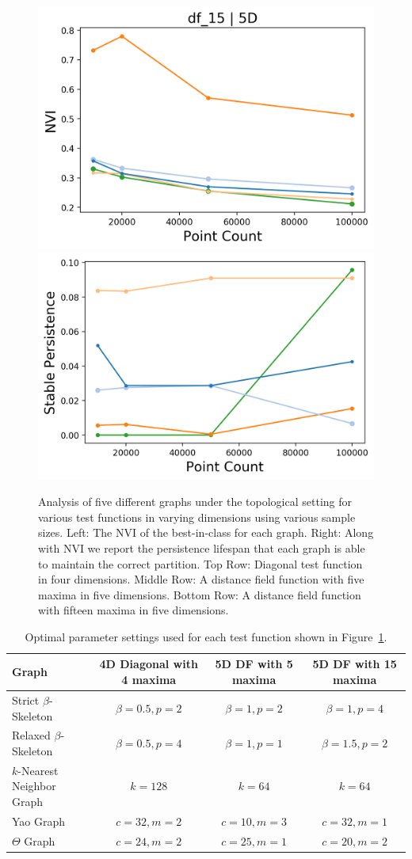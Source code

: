 \begin{figure}[htbp]
    \includegraphics[width=0.48\linewidth]{figs/chap7/df_15_5D_nvi.png}
    \includegraphics[width=0.48\linewidth]{figs/chap7/df_15_5D.png}
    \caption{Analysis of five different graphs  under the topological setting for various test functions in varying dimensions using various sample sizes.
    Left: The NVI of the best-in-class for each graph.
    Right: Along with NVI we report the persistence lifespan that each graph is able to maintain the correct partition.
    Top Row: Diagonal test function in four dimensions.
    Middle Row: A  distance field function with five maxima in five dimensions.
    Bottom Row: A  distance field function with fifteen maxima in five dimensions.}
    \label{fig:graph_topo}
\end{figure}

\begin{table}[htbp]
    \scriptsize
    \centering
    \begin{tabular}{| l | c | c | c |}
    \hline
    \textbf{Graph}  & \textbf{4D Diagonal with 4 maxima} & \textbf{5D DF with 5 maxima} & \textbf{5D DF with 15 maxima} \\
    \hline
    Strict $\beta$-Skeleton & $\beta=0.5, p=2$ & $\beta=1, p=2$  & $\beta=1, p=4$ \\
    Relaxed $\beta$-Skeleton & $\beta=0.5, p=4$ & $\beta=1, p=1$  & $\beta=1.5, p=2$ \\
    $k$-Nearest Neighbor Graph & $k=128$ & $k=64$  & $k=64$ \\
    Yao Graph & $c=32, m=2$ & $c=10, m=3$  & $c=32, m=1$ \\
    $\Theta$ Graph & $c=24, m=2$ & $c=25, m=1$  & $c=20, m=2$ \\
    \hline
    \end{tabular}
    \caption{Optimal parameter settings used for each test function shown in Figure~\ref{fig:graph_topo}.}
    \label{tab:optimal_settings}
\end{table}

